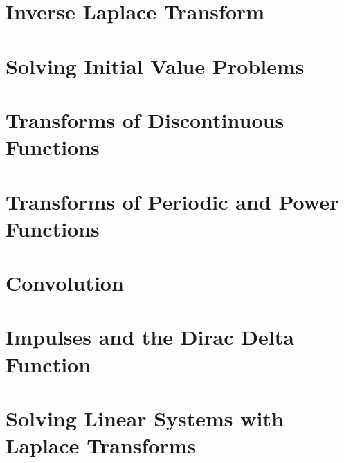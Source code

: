 \documentclass[../diffeq.tex]{subfiles}
\begin{document}
\section{Inverse Laplace Transform}
\section{Solving Initial Value Problems}
\section{Transforms of Discontinuous Functions}
\section{Transforms of Periodic and Power Functions}
\section{Convolution}
\section{Impulses and the Dirac Delta Function}
\section{Solving Linear Systems with Laplace Transforms}
\end{document}
